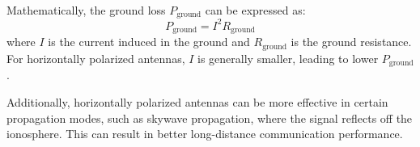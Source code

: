 Mathematically, the ground loss \( P_{\text{ground}} \) can be expressed as:
\[ P_{\text{ground}} = I^2 R_{\text{ground}} \]
where \( I \) is the current induced in the ground and \( R_{\text{ground}} \) is the ground resistance. For horizontally polarized antennas, \( I \) is generally smaller, leading to lower \( P_{\text{ground}} \).

Additionally, horizontally polarized antennas can be more effective in certain propagation modes, such as skywave propagation, where the signal reflects off the ionosphere. This can result in better long-distance communication performance.

